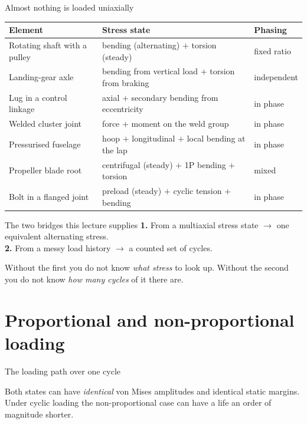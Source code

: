 \documentclass[aspectratio=169,10pt]{beamer}
\begin{document}
\begin{frame}{Almost nothing is loaded uniaxially}
\footnotesize
\begin{tabular}{@{}lll@{}}
\toprule
Element & Stress state & Phasing \\
\midrule
Rotating shaft with a pulley & bending (alternating) $+$ torsion (steady) & fixed ratio \\
Landing-gear axle & bending from vertical load $+$ torsion from braking & \alert{independent} \\
Lug in a control linkage & axial $+$ secondary bending from eccentricity & in phase \\
Welded cluster joint & force $+$ moment on the weld group & in phase \\
Pressurised fuselage & hoop $+$ longitudinal $+$ local bending at the lap & in phase \\
Propeller blade root & centrifugal (steady) $+$ 1P bending $+$ torsion & mixed \\
Bolt in a flanged joint & preload (steady) $+$ cyclic tension $+$ bending & in phase \\
\bottomrule
\end{tabular}
\vspace{6pt}

\normalsize
\begin{alertblock}{The two bridges this lecture supplies}
\textbf{1.} From a multiaxial stress state $\to$ one equivalent alternating stress.\\
\textbf{2.} From a messy load history $\to$ a counted set of cycles.
\vspace{2pt}

\footnotesize Without the first you do not know \emph{what stress} to look up. Without the second you do not know \emph{how many cycles} of it there are.
\end{alertblock}
\end{frame}

\section{Proportional and non-proportional loading}

\begin{frame}{The loading path over one cycle}
\centering


\raggedright\footnotesize
Both states can have \emph{identical} von Mises amplitudes and identical static margins. Under cyclic loading the non-proportional case can have a life an order of magnitude shorter.
\end{frame}
\end{document}
